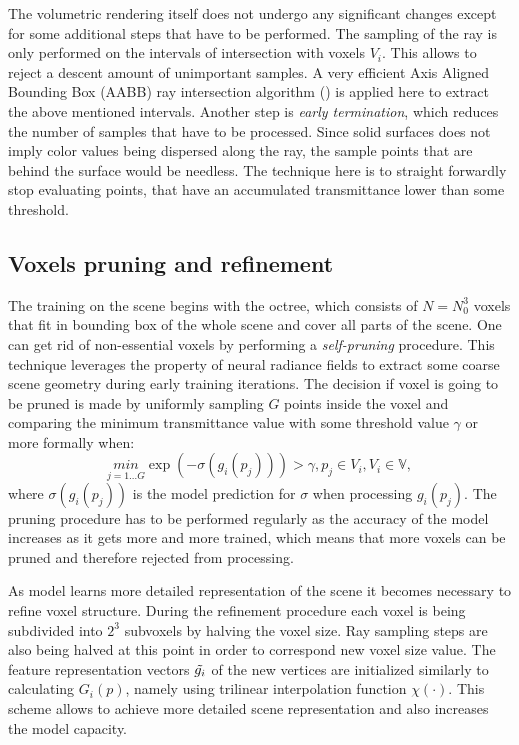 The volumetric rendering itself does not undergo any significant changes
except for some additional steps that have to be performed.
The sampling of the ray is only performed on the intervals of intersection with voxels $V_i$.
This allows to reject a descent amount of unimportant samples.
A very efficient Axis Aligned Bounding Box (AABB) ray intersection algorithm (\cite{haines1989essential}) is applied here
to extract the above mentioned intervals.
Another step is \textit{early termination}, which reduces the number of samples that have to be processed.
Since solid surfaces does not imply color values being dispersed along the ray,
the sample points that are behind the surface would be needless.
The technique here is to straight forwardly stop evaluating points,
that have an accumulated transmittance lower than some threshold.

\subsection{Voxels pruning and refinement}
\label{subsec:pruning}

The training on the scene begins with the octree,
which consists of $N=N^3_0$ voxels that fit in bounding box of the whole scene
and cover all parts of the scene.
One can get rid of non-essential voxels by performing a \textit{self-pruning} procedure.
This technique leverages the property of neural radiance fields
to extract some coarse scene geometry during early training iterations.
The decision if voxel is going to be pruned is made by uniformly sampling $G$ points inside the voxel
and comparing the minimum transmittance value with some threshold value $\gamma$ or more formally when:
\begin{equation}
    \underset{j=1 \dots G}{min} {\exp (- \sigma (g_i(p_j)))} > \gamma, p_j \in V_i, V_i \in \mathbb{V},
\end{equation}
where $\sigma (g_i(p_j))$ is the model prediction for $\sigma$ when processing $g_i(p_j)$.
The pruning procedure has to be performed regularly as the accuracy of the model increases as it gets more and more trained,
which means that more voxels can be pruned and therefore rejected from processing.

As model learns more detailed representation of the scene it becomes necessary to refine voxel structure.
During the refinement procedure each voxel is being subdivided into $2^3$ subvoxels by halving the voxel size.
Ray sampling steps are also being halved at this point in order to correspond new voxel size value.
The feature representation vectors $\Tilde{g_i}$ of the new vertices are initialized similarly to calculating $G_i(p)$,
namely using trilinear interpolation function $\chi(\cdot)$.
This scheme allows to achieve more detailed scene representation
and also increases the model capacity.



